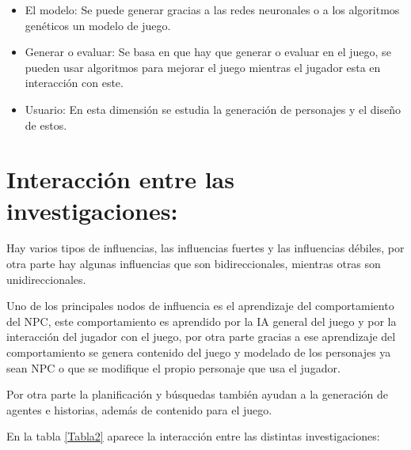 \begin{itemize}

	\item El modelo: Se puede generar gracias a las redes neuronales o a los algoritmos 	genéticos un modelo de juego.\\
		
	\item Generar o evaluar: Se basa en que hay que generar o evaluar en el juego, se pueden 	usar algoritmos para mejorar el juego mientras el jugador esta en interacción con este.\\

	\item Usuario: En esta dimensión se estudia la generación de personajes y el diseño de 	estos.\\  
	
\end{itemize}

\section{Interacción entre las investigaciones:}

Hay varios tipos de influencias, las influencias fuertes y las influencias débiles, por otra parte hay algunas influencias que son bidireccionales, mientras otras son unidireccionales.

Uno de los principales nodos de influencia es el aprendizaje del comportamiento del NPC, este comportamiento es aprendido por la IA general del juego y por la interacción del jugador con el juego, por otra parte gracias a ese aprendizaje del comportamiento se genera contenido del juego y modelado de los personajes ya sean NPC o que se modifique el propio personaje que usa el jugador.

Por otra parte la planificación y búsquedas también ayudan a la generación de agentes e historias, además de contenido para el juego.

En la tabla \ref{Tabla2} aparece la interacción entre las distintas investigaciones:\\


